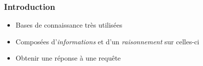 
\begin{frame}
	\frametitle{Introduction}
	\begin{itemize}
		\item Bases de connaissance très utilisées
		\item Composées d'{\em informations} et d'un {\em raisonnement} sur celles-ci
		\item Obtenir une réponse à une requête
	\end{itemize}
\end{frame}






